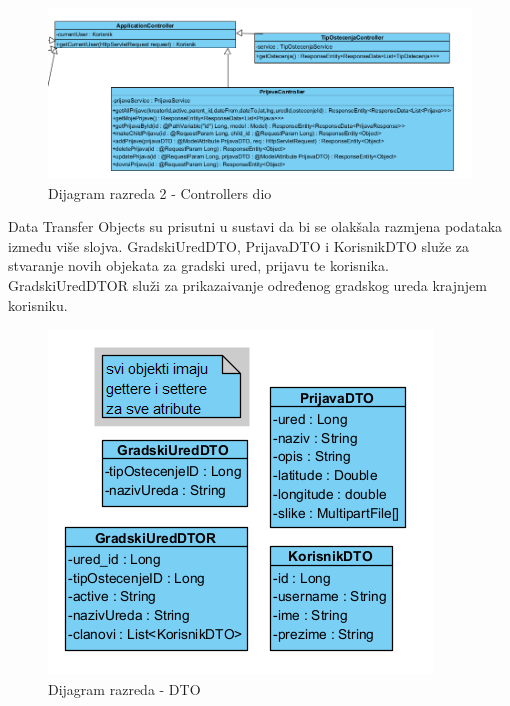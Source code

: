 		\begin{figure}[H]
			\includegraphics[scale=0.65]{slike/kontroleri2.PNG} %
			\centering
			\caption{Dijagram razreda 2 - Controllers dio}
			\label{fig:dijagraz1}
		\end{figure}
		
		Data Transfer Objects su prisutni u sustavi da bi se olakšala razmjena podataka između više slojva. GradskiUredDTO, PrijavaDTO i KorisnikDTO služe za stvaranje novih objekata za gradski ured, prijavu te korisnika. GradskiUredDTOR služi za prikazaivanje određenog gradskog ureda krajnjem korisniku.
		
		\begin{figure}[H]
			\includegraphics[scale=0.65]{slike/dto.PNG} %
			\centering
			\caption{Dijagram razreda - DTO}
			\label{fig:dijagraz1}
		\end{figure}
		
		\pagebreak
		
